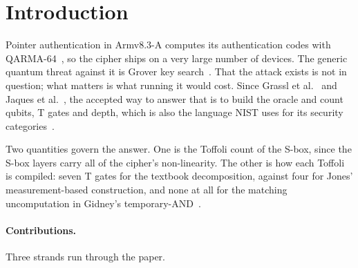 \documentclass[runningheads,10pt]{llncs}
\begin{document}
\section{Introduction}

Pointer authentication in Armv8.3-A computes its authentication codes with QARMA-64~\cite{avanzi2017qarma,qualcomm2017pac}, so the cipher ships on a very large number of devices. The generic quantum threat against it is Grover key search~\cite{grover1996fast}. That the attack exists is not in question; what matters is what running it would cost. Since Grassl et al.~\cite{grassl2016applying} and Jaques et al.~\cite{jaques2020implementing}, the accepted way to answer that is to build the oracle and count qubits, T gates and depth, which is also the language NIST uses for its security categories~\cite{nist2016submission}.

Two quantities govern the answer. One is the Toffoli count of the S-box, since the S-box layers carry all of the cipher's non-linearity. The other is how each Toffoli is compiled: seven T gates for the textbook decomposition, against four for Jones' measurement-based construction, and none at all for the matching uncomputation in Gidney's temporary-AND~\cite{jones2013lowoverhead,gidney2018halving}.

\paragraph{Contributions.} Three strands run through the paper.
\end{document}
